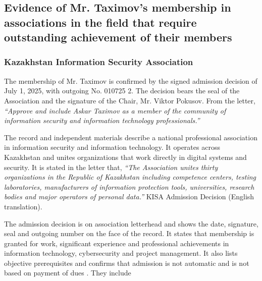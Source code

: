 \subsection{Evidence of Mr. Taximov's membership in associations in the field that require outstanding achievement of their members}
\label{subsec:Associations}

\subsubsection{Kazakhstan Information Security Association}

The membership of Mr. Taximov is confirmed by the signed admission decision of July 1, 2025, with outgoing No. 010725 2. The decision bears the seal of the Association and the signature of the Chair, Mr. Viktor Pokusov. From the letter, \emph{``Approve and include Askar Taximov as a member of the community of information security and information technology professionals.''} 

The record and independent materials describe a national professional association in information security and information technology. It operates across Kazakhstan and unites organizations that work directly in digital systems and security. It is stated in the letter that, \emph{``The Association unites thirty organizations in the Republic of Kazakhstan including competence centers, testing laboratories, manufacturers of information protection tools, universities, research bodies and major operators of personal data.''} KISA Admission Decision (English translation).

The admission decision is on association letterhead and shows the date, signature, seal and outgoing number on the face of the record. It states that membership is granted for work, significant experience and professional achievements in information technology, cybersecurity and project management. It also lists objective prerequisites and confirms that admission is not automatic and is not based on payment of dues . They include

